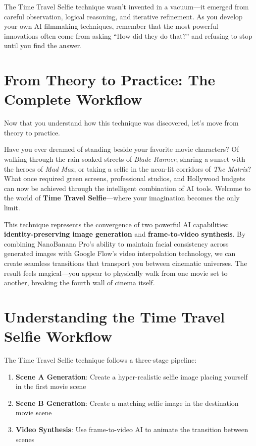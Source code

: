 The Time Travel Selfie technique wasn't invented in a vacuum—it emerged from careful observation, logical reasoning, and iterative refinement. As you develop your own AI filmmaking techniques, remember that the most powerful innovations often come from asking ``How did they do that?'' and refusing to stop until you find the answer.

\section{From Theory to Practice: The Complete Workflow}
\label{sec:theory-to-practice}

Now that you understand how this technique was discovered, let's move from theory to practice.

Have you ever dreamed of standing beside your favorite movie characters? Of walking through the rain-soaked streets of \textit{Blade Runner}, sharing a sunset with the heroes of \textit{Mad Max}, or taking a selfie in the neon-lit corridors of \textit{The Matrix}? What once required green screens, professional studios, and Hollywood budgets can now be achieved through the intelligent combination of AI tools. Welcome to the world of \textbf{Time Travel Selfie}—where your imagination becomes the only limit.

This technique represents the convergence of two powerful AI capabilities: \textbf{identity-preserving image generation} and \textbf{frame-to-video synthesis}. By combining NanoBanana Pro's ability to maintain facial consistency across generated images with Google Flow's video interpolation technology, we can create seamless transitions that transport you between cinematic universes. The result feels magical—you appear to physically walk from one movie set to another, breaking the fourth wall of cinema itself.

\section{Understanding the Time Travel Selfie Workflow}
\label{sec:time-travel-workflow}

The Time Travel Selfie technique follows a three-stage pipeline:

\begin{enumerate}
\item \textbf{Scene A Generation}: Create a hyper-realistic selfie image placing yourself in the first movie scene
\item \textbf{Scene B Generation}: Create a matching selfie image in the destination movie scene
\item \textbf{Video Synthesis}: Use frame-to-video AI to animate the transition between scenes
\end{enumerate}

